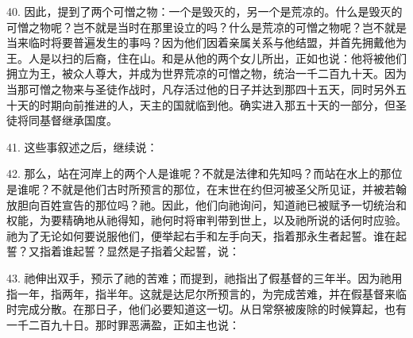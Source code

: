 40. 因此，提到了两个可憎之物：一个是毁灭的，另一个是荒凉的。什么是毁灭的可憎之物呢？岂不就是当时在那里设立的吗？什么是荒凉的可憎之物呢？岂不就是当来临时将要普遍发生的事吗？因为他们因着亲属关系与他结盟，并首先拥戴他为王。人是以扫的后裔，住在山。和是从他的两个女儿所出，正如也说：他将被他们拥立为王，被众人尊大，并成为世界荒凉的可憎之物，统治一千二百九十天。因为当那可憎之物来与圣徒作战时，凡存活过他的日子并达到那四十五天，同时另外五十天的时期向前推进的人，天主的国就临到他。确实进入那五十天的一部分，但圣徒将同基督继承国度。\par

41. 这些事叙述之后，继续说：\par

42. 那么，站在河岸上的两个人是谁呢？不就是法律和先知吗？而站在水上的那位是谁呢？不就是他们古时所预言的那位，在末世在约但河被圣父所见证，并被若翰放胆向百姓宣告的那位吗？祂。因此，他们向祂询问，知道祂已被赋予一切统治和权能，为要精确地从祂得知，祂何时将审判带到世上，以及祂所说的话何时应验。祂为了无论如何要说服他们，便举起右手和左手向天，指着那永生者起誓。谁在起誓？又指着谁起誓？显然是子指着父起誓，说：\par

43. 祂伸出双手，预示了祂的苦难；而提到，祂指出了假基督的三年半。因为祂用指一年，指两年，指半年。这就是达尼尔所预言的，为完成苦难，并在假基督来临时完成分散。在那日子，他们必要知道这一切。从日常祭被废除的时候算起，也有一千二百九十日。那时罪恶满盈，正如主也说：\par

